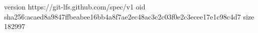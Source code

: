 version https://git-lfs.github.com/spec/v1
oid sha256:acaed8a9847ffbeabee16bb4a8f7ae2ec48ac3c2c03f0e2c3ecee17e1c98c4d7
size 182997
